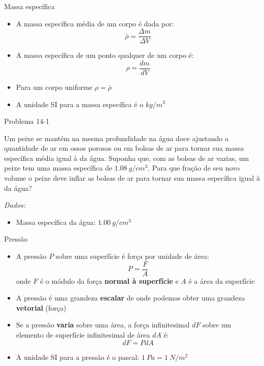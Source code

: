 \begin{frame}{Massa específica}
    \begin{itemize}
        \item A massa específica média de um corpo é dada por:
            \[
                \bar{\rho} = \frac{\Delta  m}{\Delta V}
            \]

        \item A massa específica de um ponto qualquer de um corpo é:
            \[
                \rho = \frac{dm}{dV}
            \]
        \item Para um corpo uniforme $\rho = \bar{\rho}$

        \item A unidade SI para a massa específica é o $\si{kg/m^3}$
    \end{itemize}

\end{frame}

\begin{frame}{Problema 14-1}
    \begin{minipage}{\textwidth}
        Um peixe se mantém na mesma profundidade na água doce ajustando a quantidade
        de ar em ossos porosos ou em bolsas de ar para tornar sua massa específica média
        igual à da água. Suponha que, com as bolsas de ar vazias, um peixe tem uma massa
        específica de \(\SI{1,08}{g/cm^3}\). Para que fração de seu novo volume o peixe deve inflar
        as bolsas de ar para tornar sua massa específica igual à da água?
    \end{minipage}

    \vspace{1cm}
    \textit{Dados:}
    \begin{itemize}
        \item Massa específica da água: \(\SI{1,00}{g/cm^3}\)
    \end{itemize}
\end{frame}

\begin{frame}{Pressão}

    \begin{itemize}
        \item A pressão $P$ sobre uma superfície é força por unidade de área:
            \[
                P=\frac{F}{A}
            \]
            onde $F$ é o módulo da força \textbf{normal à superfície} e $A$ é a área da superfície
        \item A pressão é uma grandeza \textbf{escalar} de onde podemos obter uma grandeza \textbf{vetorial} (força)

        \item Se a pressão \textbf{varia} sobre uma área, a força infinitesimal
            $dF$ sobre um elemento de superfície infinitesimal de área $dA$ é:
            \[
                dF=P dA
            \]
        \item A unidade SI para a pressão é o pascal: $\SI{1}{Pa} = \SI{1}{N/m^2}$
    \end{itemize}
\end{frame}

